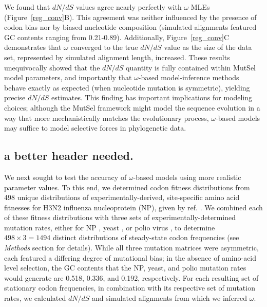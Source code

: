 \documentclass[11pt]{article}
\begin{document}
We found that $dN/dS$ values agree nearly perfectly with $\omega$ MLEs (Figure~\ref{reg_conv}B). This agreement was neither influenced by the presence of codon bias nor by biased nucleotide composition (simulated alignments featured GC contents ranging from 0.21-0.89). Additionally, Figure~\ref{reg_conv}C demonstrates that $\omega$ converged to the true $dN/dS$ value as the size of the data set, represented by simulated alignment length, increased. These results unequivocally showed that the $dN/dS$ quantity is fully contained within MutSel model parameters, and importantly that $\omega$-based model-inference methods behave exactly as expected (when nucleotide mutation is symmetric), yielding precise $dN/dS$ estimates. This finding has important implications for modeling choices; although the MutSel framework might model the sequence evolution in a way that more mechanistically matches the evolutionary process, $\omega$-based models may suffice to model selective forces in phylogenetic data.


\subsection*{a better header needed.}
We next sought to test the accuracy of $\omega$-based models using more realistic parameter values. To this end, we determined codon fitness distributions from 498 unique distributions of experimentally-derived, site-specific amino acid fitnesses for H3N2 influenza nucleoprotein (NP), given by ref. \cite{Bloom2014a}. We combined each of these fitness distributions with three sets of experimentally-determined mutation rates, either for NP \cite{Bloom2014a}, yeast \cite{Zhu2014}, or polio virus \cite{Acevedo2014}, to determine $498 \times 3 = 1494$ distinct distributions of steady-state codon frequencies (see \emph{Methods} section for details). While all three mutation matrices were asymmetric, each featured a differing degree of mutational bias; in the absence of amino-acid level selection, the GC contents that the NP, yeast, and polio mutation rates would generate are 0.518, 0.336, and 0.192, respectively. For each resulting set of stationary codon frequencies, in combination with its respective set of mutation rates, we calculated $dN/dS$ and simulated alignments from which we inferred $\omega$.
\end{document}
